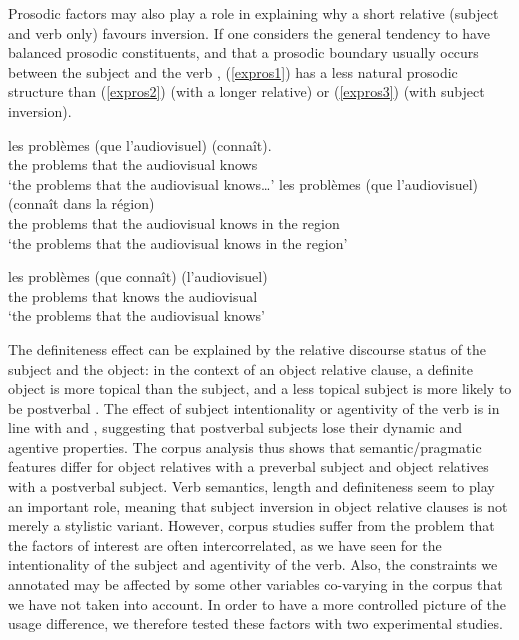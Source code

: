 \documentclass[output=paper]{langscibook}
\begin{document}
Prosodic factors may also play a role in explaining why a short relative (subject and verb only) favours inversion. If one considers the general tendency to have balanced prosodic constituents, and that a prosodic boundary usually occurs between the subject and the verb \citep{di2016}, (\ref{expros1}) has a less natural prosodic structure than (\ref{expros2}) (with a longer relative) or (\ref{expros3}) (with subject inversion).



\begin{exe}
\ex \label{expros1}

\gll les problèmes (que l’audiovisuel) (connaît).\\
the problems that {the audiovisual} knows \\    
\glt ‘the problems that the audiovisual knows…'
\ex \label{expros2}
\gll les problèmes (que l’audiovisuel) (connaît dans la région) \\
the problems that {the audiovisual} knows in the region \\    
\glt ‘the problems that the audiovisual knows in the region’

\ex \label{expros3}
\gll les problèmes (que connaît) (l’audiovisuel) \\
the problems that knows {the audiovisual}\\    
\glt‘the problems that the audiovisual knows’
\end{exe}


The definiteness effect can be explained by the relative discourse
status of the subject and the object: in the context of an object
relative clause, a definite object is more topical than the subject,
and a less topical subject is more likely to be postverbal
\citep{kampers2004}. The effect of subject intentionality or
agentivity of the verb is in line with \citet{marandin2011} and
\citet{Bonami}, suggesting that postverbal subjects lose their dynamic
and agentive properties.
The corpus analysis thus shows that semantic/pragmatic features differ
for object relatives with a preverbal subject and object relatives
with a postverbal subject. Verb semantics, length and definiteness
seem to play an important role, meaning that subject inversion in
object relative clauses is not merely a stylistic variant. However,
corpus studies suffer from the problem that the factors of interest
are often intercorrelated, as we have seen for the intentionality of
the subject and agentivity of the verb. Also, the constraints we
annotated may be affected by some other variables co-varying in the
corpus that we have not taken into account. In order to have a more
controlled picture of the usage difference, we therefore tested these
factors with two experimental studies.
\end{document}
